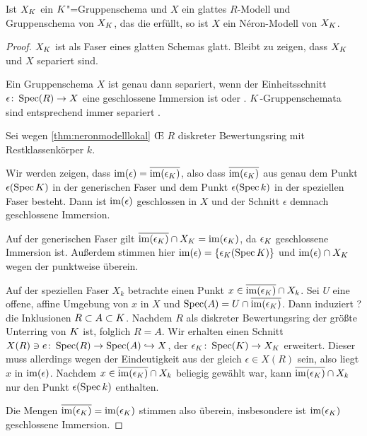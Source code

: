 \documentclass[german]{scrreprt}
\begin{document}
\begin{Bemerkung}\label{nerongruppenschemaglatt}
  Ist $X_{K}$ ein $K$"=Gruppenschema und $X$ ein
  glattes $R$-Modell und Gruppenschema von $X_{K}$, das die
  \NAbbEig erfüllt, so ist $X$ ein Néron-Modell von $X_{K}$.
  \begin{proof}
    $X_{K}$ ist als Faser eines glatten Schemas glatt. Bleibt zu
    zeigen, dass $X_{K}$ und $X$ separiert sind.
    
    Ein Gruppenschema $X$ ist genau dann separiert, wenn der
    Einheitsschnitt $\epsilon\colon\operatorname{Spec}(R)\to X$ eine geschlossene
    Immersion ist
    \cite[Lemma 38.6.1]{stacksproject} oder \cite[7.1, Lemma 2]{neron}.
    $K$-Gruppenschemata sind entsprechend immer separiert
    \cite[Lemma 38.7.3]{stacksproject}. 

    Sei wegen \autoref{thm:neronmodelllokal} \OE{} $R$ diskreter
    Bewertungsring mit Restklassenkörper $k$.
      
    Wir werden zeigen, dass
    $\operatorname{im}(\epsilon)=\overline{\operatorname{im}(\epsilon_{K})}$,
    also dass $\overline{\operatorname{im}(\epsilon_{K})}$ aus genau dem Punkt
    $\epsilon(\operatorname{Spec}K)$ in der generischen Faser und dem Punkt
    $\epsilon(\operatorname{Spec} k)$ in der speziellen Faser besteht.
    Dann ist $\operatorname{im}(\epsilon)$ geschlossen in $X$ und der Schnitt
    $\epsilon$ demnach geschlossene Immersion.
    
    Auf der generischen Faser gilt
    $\overline{\operatorname{im}(\epsilon_{K})}\cap X_{K}=\operatorname{im}(\epsilon_{K})$,
    da $\epsilon_{K}$ geschlossene Immersion ist.
    Außerdem stimmen hier $\operatorname{im}(\epsilon)=\{\epsilon_{K}(\operatorname{Spec}K)\}$ und
    $\operatorname{im}(\epsilon)\cap X_{K}$ wegen der \NAbbEig punktweise
    überein.

    Auf der speziellen Faser $X_k$ betrachte einen Punkt
    $x\in\overline{\operatorname{im}(\epsilon_{K})}\cap X_k$. Sei $U$ eine
    offene, affine Umgebung von $x$ in $X$ und
    $\operatorname{Spec}(A)=U\cap\overline{\operatorname{im}(\epsilon_{K})}$.
    Dann induziert  ?
    die Inklusionen $R\subset A\subset K$.
    Nachdem $R$ als diskreter Bewertungsring der größte Unterring
    von $K$ ist, folglich $R=A$.
    Wir erhalten einen Schnitt
    $X(R)\ni e\colon\operatorname{Spec}(R)\to\operatorname{Spec}(A)\hookrightarrow X$,
    der $\epsilon_{K}\colon\operatorname{Spec}(K)\to X_{K}$ erweitert.
    Dieser muss allerdings wegen der Eindeutigkeit aus der \NAbbEig
    gleich $\epsilon\in X(R)$ sein, also liegt $x$ in $\operatorname{im}(\epsilon)$.
    Nachdem $x\in \overline{\operatorname{im}(\epsilon_{K})}\cap X_k$ beliegig
    gewählt war, kann $\overline{\operatorname{im}(\epsilon_{K})}\cap X_k$ nur den
    Punkt $\epsilon(\operatorname{Spec} k)$ enthalten.

    Die Mengen $\overline{\operatorname{im}(\epsilon_{K})}=\operatorname{im}(\epsilon_{K})$ stimmen
    also überein, insbesondere ist $\operatorname{im}(\epsilon_{K})$ geschlossene
    Immersion.
  \end{proof}
\end{Bemerkung}
\end{document}
